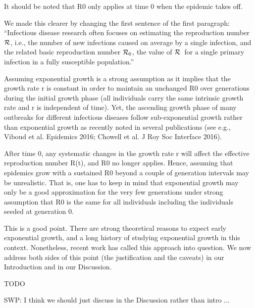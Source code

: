 \documentclass[12pt]{article}
\newcommand{\RR}{\ensuremath{{\cal R}}}
\newcommand{\Rx}[1]{\ensuremath{{\cal R}_{#1}}}
\newcommand{\Ro}{\Rx{0}}
\newcommand{\revtext}{\textsf}
\begin{document}
\revtext{It should be noted that R0 only applies at time 0 when the epidemic takes off.}

We made this clearer by changing the first sentence of the first paragraph: ``Infectious disease research often focuses on estimating the reproduction number \RR, i.e., the number of new infections caused on average by a single infection, and the related basic reproduction number \Ro, the value of \RR\ for a single primary infection in a fully susceptible population.''

\revtext{Assuming exponential growth is a strong assumption as it
implies that the growth rate r is constant in order to maintain an
unchanged R0 over generations during the initial growth phase (all
individuals carry the same intrinsic growth rate and r is independent
of time). Yet, the ascending growth phase of many outbreaks for
different infectious diseases follow sub-exponential growth rather
than exponential growth as recently noted in several publications
(see e.g.,  Viboud et al. Epidemics 2016; Chowell et al. J Roy Soc
Interface 2016).}

\revtext{After time 0, any systematic changes in the growth rate r will
affect the effective reproduction number R(t), and R0 no longer
applies.  Hence, assuming that epidemics grow with a sustained R0
beyond a couple of generation intervals may be unrealistic. That is,
one has to keep in mind that exponential growth may only be a good
approximation for the very few generations under strong assumption
that R0 is the same for all individuals including the individuals
seeded at generation 0.}

This is a good point. There are strong theoretical reasons to expect early exponential growth, and a long history of studying exponential growth in this context. Nonetheless, recent work has called this approach into question. We now address both sides of this point (the justification and the caveats) in our Introduction and in our Discussion.

TODO

SWP: I think we should just discuss in the Discussion rather than intro ...
\end{document}
